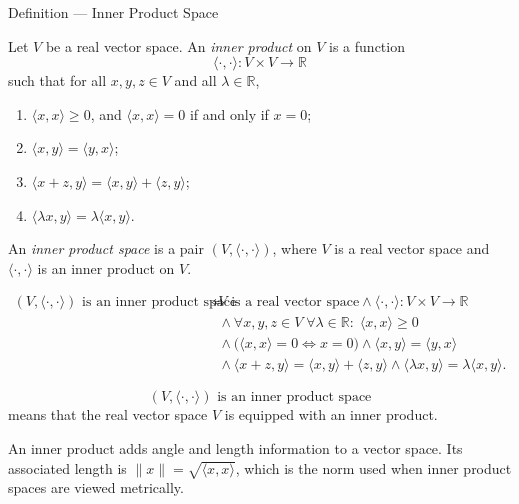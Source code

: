 \begin{definitionbox}{Definition --- Inner Product Space}
\begin{definition}\label{def:inner-product-space}
Let \(V\) be a real vector space.  An \emph{inner product} on \(V\) is a
function
\[
  \langle\cdot,\cdot\rangle:V\times V\to\mathbb{R}
\]
such that for all \(x,y,z\in V\) and all \(\lambda\in\mathbb{R}\),
\begin{enumerate}
  \item \(\langle x,x\rangle\geq 0\), and
        \(\langle x,x\rangle=0\) if and only if \(x=0\);
  \item \(\langle x,y\rangle=\langle y,x\rangle\);
  \item \(\langle x+z,y\rangle=\langle x,y\rangle+\langle z,y\rangle\);
  \item \(\langle \lambda x,y\rangle=\lambda\langle x,y\rangle\).
\end{enumerate}
An \emph{inner product space} is a pair
\((V,\langle\cdot,\cdot\rangle)\), where \(V\) is a real vector space and
\(\langle\cdot,\cdot\rangle\) is an inner product on \(V\).
\end{definition}
\end{definitionbox}

\begin{remark*}
\[
\begin{aligned}
\text{\((V,\langle\cdot,\cdot\rangle)\) is an inner product space}
\Longleftrightarrow\;&
V\text{ is a real vector space}
\land
\langle\cdot,\cdot\rangle:V\times V\to\mathbb{R}
\\
&{}\land
\forall x,y,z\in V\;\forall \lambda\in\mathbb{R}{:}\;
\langle x,x\rangle\geq0
\\
&{}\land
\bigl(\langle x,x\rangle=0\Longleftrightarrow x=0\bigr)
\land
\langle x,y\rangle=\langle y,x\rangle
\\
&{}\land
\langle x+z,y\rangle=\langle x,y\rangle+\langle z,y\rangle
\land
\langle\lambda x,y\rangle=\lambda\langle x,y\rangle.
\end{aligned}
\]
\end{remark*}

\begin{remark*}
\[
\text{\((V,\langle\cdot,\cdot\rangle)\) is an inner product space}
\]
means that the real vector space \(V\) is equipped with an inner product.
\end{remark*}

\begin{remark*}[Interpretation]
An inner product adds angle and length information to a vector space.  Its
associated length is \(\|x\|=\sqrt{\langle x,x\rangle}\), which is the norm
used when inner product spaces are viewed metrically.
\end{remark*}

\DefinitionalRoot
